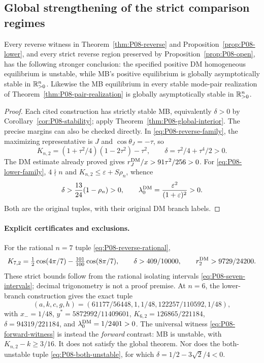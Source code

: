 \subsection{Global strengthening of the strict comparison regimes}
\begin{corollary}
\label{cor:P08-global-contrast}
Every reverse witness in Theorem~\ref{thm:P08-reverse} and
Proposition~\ref{prop:P08-lower}, and every strict reverse region
preserved by Proposition~\ref{prop:P08-open}, has the following stronger
conclusion: the specified positive DM homogeneous equilibrium is
unstable, while MB's positive equilibrium is globally asymptotically
stable in $\mathbb{R}_{>0}^{n}$. Likewise the MB equilibrium in every stable
mode-pair realization of Theorem~\ref{thm:P08-pair-realization} is
globally asymptotically stable in $\mathbb{R}_{>0}^{n}$.
\end{corollary}
\begin{proof}
Each cited construction has strictly stable MB, equivalently
$\delta>0$ by Corollary~\ref{cor:P08-stability}; apply
Theorem~\ref{thm:P08-global-interior}. The precise margins can also
be checked directly. In \eqref{eq:P08-reverse-family}, the maximizing
representative is $J$ and $\cos\theta_J=-\tau$, so
\[
 K_{n,2}=(1+\tau^2/4)(1-2\tau^2)-\tau^2,\qquad
 \delta=\tau^2/4+\tau^4/2>0.
\]
The DM estimate already proved gives $r_J^{\mathrm{DM}}/x>91\tau^2/256>0$.
For \eqref{eq:P08-lower-family}, $4\nmid n$ and
$K_{n,2}\le\varepsilon+S\rho_n$, whence
\[
 \delta>\frac{13}{24}(1-\rho_n)>0,\qquad
 \lambda_0^{\mathrm{DM}}=\frac{\varepsilon^2}{(1+\varepsilon)^2}>0.
\]
Both are the original tuples, with their original DM branch labels.
\end{proof}

\paragraph{Explicit certificates and exclusions.}
For the rational $n=7$ tuple \eqref{eq:P08-reverse-rational},
\[
 K_{7,2}=\tfrac12\cos(4\pi/7)-\tfrac{101}{100}\cos(8\pi/7),
 \qquad \delta>409/10000,\qquad r_2^{\mathrm{DM}}>9729/24200.
\]
These strict bounds follow from the rational isolating intervals
\eqref{eq:P08-seven-intervals}; decimal trigonometry is not a proof premise.
At $n=6$, the lower-branch construction gives the exact tuple
\[
 (a,k,c,g,h)=(61177/56448,1,1/48,122257/110592,1/48),
\]
with $x_-=1/48$, $y^*=5872992/11409601$,
$K_{6,2}=126865/221184$, $\delta=94319/221184$, and
$\lambda_0^{\mathrm{DM}}=1/2401>0$.
The universal witness \eqref{eq:P08-forward-witness} is instead the
\emph{forward} contrast: MB is unstable, with $K_{n,2}-k\ge3/16$.
It does not satisfy the global theorem. Nor does the both-unstable
tuple \eqref{eq:P08-both-unstable}, for which
$\delta=1/2-3\sqrt2/4<0$.

